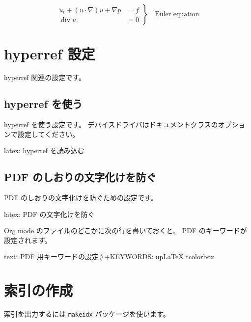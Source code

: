 \documentclass[dvipdfmx,a4j,14pt,uplatex,openany]{jsbook}
\begin{document}
\begin{equation}
    \left.
    \begin{aligned}
        u_t + (u \cdot \nabla)u + \nabla p &= f \\
        \operatorname{div} u               &= 0
    \end{aligned}
    \right\} 
    \quad \text{Euler equation}
\end{equation}


\section{hyperref 設定}
\label{sec:orgac2b84b}
hyperref 関連の設定です。

\subsection{hyperref を使う}
\label{sec:orgeb3314e}
hyperref を使う設定です。
デバイスドライバはドキュメントクラスのオプションで設定してください。

\begin{programlist}[label={org29a0374}]{latex}{: hyperref を読み込む}\usepackage{hyperref}
\end{programlist}

\subsection{PDF のしおりの文字化けを防ぐ}
\label{sec:org51e5d3a}
PDF のしおりの文字化けを防ぐための設定です。

\begin{programlist}[label={org49a2d94}]{latex}{: PDF の文字化けを防ぐ}\usepackage{pxjahyper}
\end{programlist}


Org mode のファイルのどこかに次の行を書いておくと、
PDF のキーワードが設定されます。

\begin{programlist}[label={orgf49c734}]{text}{: PDF 用キーワードの設定}#+KEYWORDS:  upLaTeX tcolorbox
\end{programlist}

\section{索引の作成}
\label{sec:orga9cb3f6}

索引を出力するには \texttt{makeidx} パッケージを使います。
\end{document}
